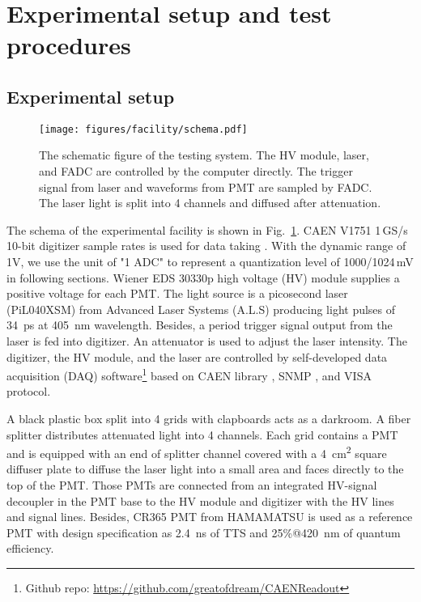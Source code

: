 \section{Experimental setup and test procedures}
\label{SetUp}
\subsection{Experimental setup}
\label{sec:setup}
\begin{figure}[!htbp]
    \centering
    \texttt{[image: figures/facility/schema.pdf]}
    \caption{The schematic figure of the testing system. The HV module, laser, and FADC are controlled by the computer directly. The trigger signal from laser and waveforms from PMT are sampled by FADC. The laser light is split into 4 channels and diffused after attenuation.}
    \label{fig:facility}
\end{figure}

The schema of the experimental facility is shown in Fig.~\ref{fig:facility}. CAEN V1751 1\,GS/s 10-bit digitizer sample rates is used for data taking \cite{CAENV1751}. With the dynamic range of 1V, we use the unit of "1 ADC" to represent a quantization level of 1000/1024\,mV \cite{JUNOPrototype} in following sections. Wiener EDS 30330p high voltage (HV) module \cite{WIENERHV} supplies a positive voltage for each PMT. The light source is a picosecond laser (PiL040XSM) from Advanced Laser Systems (A.L.S) \cite{NTKLaser} producing light pulses of \SI{34}{ps} at \SI{405}{nm} wavelength. Besides, a period trigger signal output from the laser is fed into digitizer. An attenuator is used to adjust the laser intensity. The digitizer, the HV module, and the laser are controlled by self-developed data acquisition (DAQ) software\footnote{Github repo: \url{https://github.com/greatofdream/CAENReadout}} based on CAEN library \cite{CAENLIB}, SNMP \cite{SNMP}, and VISA \cite{VISA} protocol.

A black plastic box split into 4 grids with clapboards acts as a darkroom. A fiber splitter distributes attenuated light into 4 channels. Each grid contains a PMT and is equipped with an end of splitter channel covered with a \SI{4}{cm\tothe{2}} square diffuser plate to diffuse the laser light into a small area and faces directly to the top of the PMT. Those PMTs are connected from an integrated HV-signal decoupler in the PMT base to the HV module and digitizer with the HV lines and signal lines. Besides, CR365 PMT \cite{BJBS} from HAMAMATSU is used as a reference PMT with design specification as \SI{2.4}{ns} of TTS and 25\%@\SI{420}{nm} of quantum efficiency.

